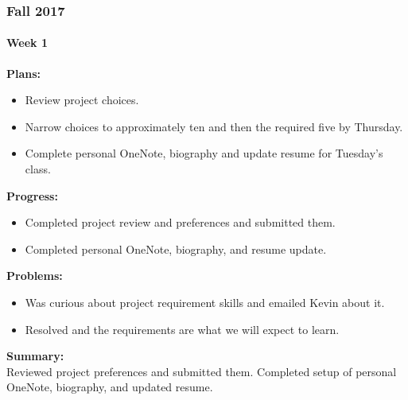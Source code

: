 \subsubsection{Fall 2017}
\paragraph{Week 1}
\begin{adjustwidth}{2.5em}{0pt}
    \vspace{-0.5cm}\textbf{Plans:}
    \vspace{-0.5cm}
    \begin{itemize}
        \item Review project choices. 
        \item Narrow choices to approximately ten and then the required five by Thursday. 
        \item Complete personal OneNote, biography and update resume for Tuesday's class. 
    \end{itemize} 
    \vspace{-0.3cm}\textbf{Progress:}
    \vspace{-0.5cm}
    \begin{itemize}
        \item Completed project review and preferences and submitted them. 
        \item Completed personal OneNote, biography, and resume update. 
    \end{itemize} 
    \vspace{-0.3cm}\textbf{Problems:}
    \vspace{-0.5cm}
    \begin{itemize}
        \item Was curious about project requirement skills and emailed Kevin about it. 
        \item Resolved and the requirements are what we will expect to learn.
    \end{itemize}  
    \vspace{-0.3cm}\noindent\textbf{Summary:}\\
    \noindent Reviewed project preferences and submitted them. Completed setup of personal OneNote, biography, and updated resume. \\
\end{adjustwidth}

